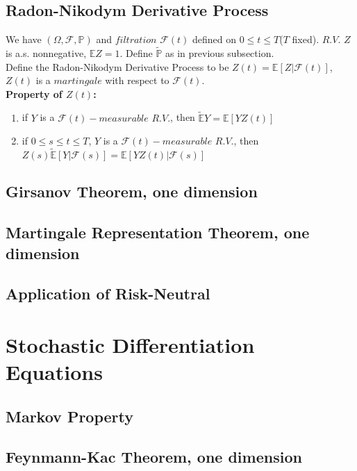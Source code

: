 \documentclass[a4paper, 12pt]{article}
\begin{document}
\subsection{Radon-Nikodym Derivative Process}
We have $(\Omega, \mathcal{F}, \mathbb{P})$ and $filtration$ $\mathcal{F}(t)$ defined on $0 \leq t \leq T$($T$ fixed). $R.V.$ $Z$ is a.s. nonnegative, $\mathbb{E}Z = 1$. Define $\widetilde{\mathbb{P}}$ as in previous subsection.\\
\indent Define the Radon-Nikodym Derivative Process to be $Z(t) = \mathbb{E}[Z|\mathcal{F}(t)]$, $Z(t)$ is a $martingale$ with respect to $\mathcal{F}(t)$.\\
\textbf{Property of $Z(t)$: }
\begin{enumerate}
	\item if $Y$ is a $\mathcal{F}(t)-measurable$ $R.V.$, then $\widetilde{\mathbb{E}}Y = \mathbb{E}[YZ(t)]$
	\item if $0 \leq s \leq t \leq T$, $Y$ is a $\mathcal{F}(t)-measurable$ $R.V.$, then \\$Z(s) \widetilde{\mathbb{E}}[Y|\mathcal{F}(s)] = \mathbb{E}[YZ(t)|\mathcal{F}(s)]$
\end{enumerate}

\subsection{Girsanov Theorem, one dimension}

\subsection{Martingale Representation Theorem, one dimension}

\subsection{Application of Risk-Neutral}

\section{Stochastic Differentiation Equations}

\subsection{Markov Property}

\subsection{Feynmann-Kac Theorem, one dimension}
\end{document}
